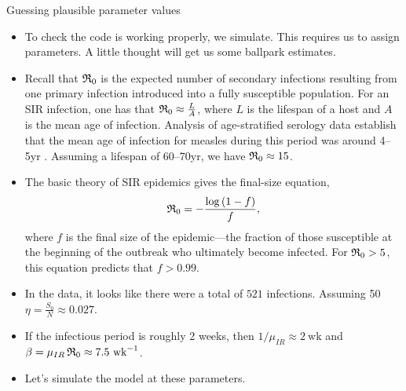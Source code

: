 \begin{frame}{Guessing plausible parameter values}

  \begin{itemize}

  \item To check the code is working properly, we simulate. This requires us to assign parameters. A little thought will get us some ballpark estimates.

  \item Recall that $\mathfrak{R}_0$ is the expected number of secondary infections resulting from one primary infection introduced into a fully susceptible population.
    For an SIR infection, one has that $\mathfrak{R}_0\approx\frac{L}{A}$, where $L$ is the lifespan of a host and $A$ is the mean age of infection.
    Analysis of age-stratified serology data establish that the mean age of infection for measles during this period was around 4--5yr \citep{Anderson1991}.
    Assuming a lifespan of 60--70yr, we have $\mathfrak{R}_0\approx 15$.

  \item The basic theory of SIR epidemics gives the final-size equation,
    $$\mathfrak{R}_0 = -\frac{\log{(1-f)}}{f},$$
    where $f$ is the final size of the epidemic---the fraction of those susceptible at the beginning of the outbreak who ultimately become infected.
    For $\mathfrak{R}_0>5$, this equation predicts that $f>0.99$.

  \item In the data, it looks like there were a total of $521$ infections.
    Assuming 50%
    $\eta=\frac{S_0}{N}\approx0.027$.

  \item If the infectious period is roughly 2 weeks, then $1/\mu_{IR} \approx 2~\text{wk}$ and $\beta = \mu_{IR}\,\mathfrak{R}_0 \approx 7.5~\text{wk}^{-1}$.

  \item Let's simulate the model at these parameters.


\end{itemize}
\end{frame}
